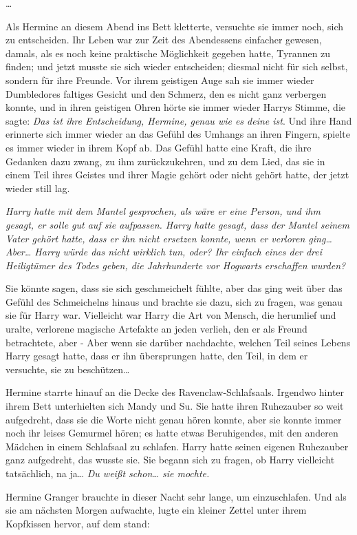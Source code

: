 {…

Als Hermine an diesem Abend ins Bett kletterte, versuchte sie immer noch, sich zu entscheiden. Ihr Leben war zur Zeit des Abendessens einfacher gewesen, damals, als es noch keine praktische Möglichkeit gegeben hatte, Tyrannen zu finden; und jetzt musste sie sich wieder entscheiden; diesmal nicht für sich selbst, sondern für ihre Freunde. Vor ihrem geistigen Auge sah sie immer wieder Dumbledores faltiges Gesicht und den Schmerz, den es nicht ganz verbergen konnte, und in ihren geistigen Ohren hörte sie immer wieder Harrys Stimme, die sagte: \emph{Das ist ihre Entscheidung, Hermine, genau wie es deine ist}. Und ihre Hand erinnerte sich immer wieder an das Gefühl des Umhangs an ihren Fingern, spielte es immer wieder in ihrem Kopf ab. Das Gefühl hatte eine Kraft, die ihre Gedanken dazu zwang, zu ihm zurückzukehren, und zu dem Lied, das sie in einem Teil ihres Geistes und ihrer Magie gehört oder nicht gehört hatte, der jetzt wieder still lag.

\emph{Harry hatte mit dem Mantel gesprochen, als wäre er eine Person, und ihm gesagt, er solle gut auf sie aufpassen. Harry hatte gesagt, dass der Mantel seinem Vater gehört hatte, dass er ihn nicht ersetzen konnte, wenn er verloren ging… Aber… Harry würde das nicht wirklich tun, oder? Ihr einfach eines der drei Heiligtümer des Todes geben, die Jahrhunderte vor Hogwarts erschaffen wurden?}

Sie könnte sagen, dass sie sich geschmeichelt fühlte, aber das ging weit über das Gefühl des Schmeichelns hinaus und brachte sie dazu, sich zu fragen, was genau sie für Harry war. Vielleicht war Harry die Art von Mensch, die herumlief und uralte, verlorene magische Artefakte an jeden verlieh, den er als Freund betrachtete, aber - Aber wenn sie darüber nachdachte, welchen Teil seines Lebens Harry gesagt hatte, dass er ihn übersprungen hatte, den Teil, in dem er versuchte, sie zu beschützen…

Hermine starrte hinauf an die Decke des Ravenclaw-Schlafsaals. Irgendwo hinter ihrem Bett unterhielten sich Mandy und Su. Sie hatte ihren Ruhezauber so weit aufgedreht, dass sie die Worte nicht genau hören konnte, aber sie konnte immer noch ihr leises Gemurmel hören; es hatte etwas Beruhigendes, mit den anderen Mädchen in einem Schlafsaal zu schlafen. Harry hatte seinen eigenen Ruhezauber ganz aufgedreht, das wusste sie. Sie begann sich zu fragen, ob Harry vielleicht tatsächlich, na ja… \emph{Du weißt schon… sie mochte.}

Hermine Granger brauchte in dieser Nacht sehr lange, um einzuschlafen. Und als sie am nächsten Morgen aufwachte, lugte ein kleiner Zettel unter ihrem Kopfkissen hervor, auf dem stand:

}

